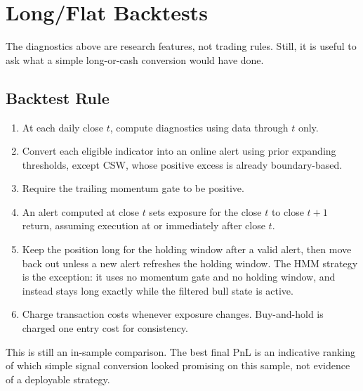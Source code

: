 \documentclass[11pt]{article}
\begin{document}
\section{Long/Flat Backtests}

The diagnostics above are research features, not trading rules. Still, it is useful to ask what a simple long-or-cash conversion would have done.

\subsection{Backtest Rule}

\begin{enumerate}
    \item At each daily close $t$, compute diagnostics using data through $t$ only.
    \item Convert each eligible indicator into an online alert using prior expanding thresholds, except CSW, whose positive excess is already boundary-based.
    \item Require the trailing momentum gate to be positive.
    \item An alert computed at close $t$ sets exposure for the close $t$ to close $t+1$ return, assuming execution at or immediately after close $t$.
    \item Keep the position long for the holding window after a valid alert, then move back out unless a new alert refreshes the holding window. The HMM strategy is the exception: it uses no momentum gate and no holding window, and instead stays long exactly while the filtered bull state is active.
    \item Charge transaction costs whenever exposure changes. Buy-and-hold is charged one entry cost for consistency.
\end{enumerate}

This is still an in-sample comparison. The best final PnL is an indicative ranking of which simple signal conversion looked promising on this sample, not evidence of a deployable strategy.

\begin{table}[H]
\centering
\scriptsize
\setlength{\tabcolsep}{4pt}
\caption{Best long/flat structure-break strategy by final equity multiple. Best structure signal excludes buy-and-hold; best including buy-and-hold includes it. Max DD, exposure, and trades refer to the best structure signal.}
\end{table}
\end{document}
